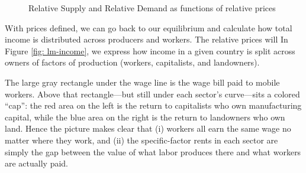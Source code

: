 \documentclass[11pt,letterpaper]{article}
\begin{document}
{\begin{figure}
        \caption{Relative Supply and Relative Demand as functions of relative prices}
    \label{fig: rd-rs-autarky}
\end{figure}

With prices defined, we can go back to our equilibrium and calculate how total income is distributed across producers and workers. The relative prices will In Figure \ref{fig: lm-income}, we express how income in a given country is split across owners of factors of production (workers, capitalists, and landowners).

The large gray rectangle under the wage line is the wage bill paid to mobile workers. Above that rectangle—but still under each sector’s curve—sits a colored “cap”: the red area on the left is the return to capitalists who own manufacturing capital, while the blue area on the right is the return to landowners who own land. Hence the picture makes clear that (i) workers all earn the same wage no matter where they work, and (ii) the specific-factor rents in each sector are simply the gap between the value of what labor produces there and what workers are actually paid.

}
\end{document}
